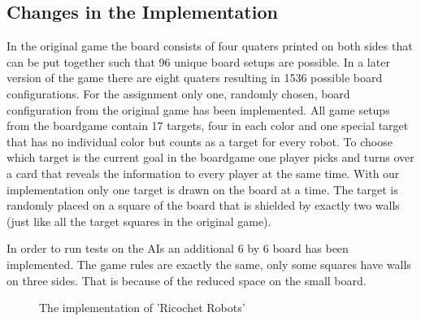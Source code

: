 \documentclass[a4paper,10pt]{article}
\begin{document}
\subsection{Changes in the Implementation}
In the original game the board consists of four quaters printed on both sides that can be put together such that 96 unique board setups are possible. In a later version of the game there are eight quaters resulting in 1536 possible board configurations. For the assignment only one, randomly chosen, board configuration from the original game has been implemented. All game setups from the boardgame contain 17 targets, four in each color and one special target that has no individual color but counts as a target for every robot. To choose which target is the current goal in the boardgame one player picks and turns over a card that reveals the information to every player at the same time. With our implementation only one target is drawn on the board at a time. The target is randomly placed on a square of the board that is shielded by exactly two walls (just like all the target squares in the original game).
\par
In order to run tests on the AIs an additional 6 by 6 board has been implemented. The game rules are exactly the same, only some squares have walls on three sides. That is because of the reduced space on the small board.
\begin{figure}
\caption{The implementation of 'Ricochet Robots'}
\label{fig:implementation}
\end{figure}
\end{document}
